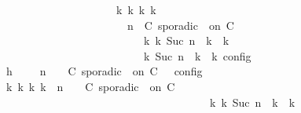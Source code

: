 \begin{isabellebody}
\ \ \ \ \ \ \ \ \ \ \ \ \ \ \ \ \ \ \ \ {\isasymLongrightarrow}\ {\isasymexists}{\isasymGamma}\isactrlsub k\ {\isasymPsi}\isactrlsub k\ {\isasymPhi}\isactrlsub k\ k{\isachardot}\isanewline
\ \ \ \ \ \ \ \ \ \ \ \ \ \ \ \ \ \ \ \ \ \ {\isacharparenleft}{\isacharparenleft}{\isasymGamma}{\isacharcomma}\ n\ {\isasymturnstile}\ {\isacharparenleft}{\isacharparenleft}C\ sporadic\ {\isasymtau}\ on\ C\ {\isacharhash}\ {\isasymPsi}{\isacharparenright}\ {\isasymtriangleright}\ {\isasymPhi}{\isacharparenright}\isanewline
\ \ \ \ \ \ \ \ \ \ \ \ \ \ \ \ \ \ \ \ \ \ \ \ \ \ {\isasymhookrightarrow}\isactrlbsup k\isactrlesup \ {\isacharparenleft}{\isasymGamma}\isactrlsub k{\isacharcomma}\ Suc\ n\ {\isasymturnstile}\ {\isasymPsi}\isactrlsub k\ {\isasymtriangleright}\ {\isasymPhi}\isactrlsub k{\isacharparenright}{\isacharparenright}\isanewline
\ \ \ \ \ \ \ \ \ \ \ \ \ \ \ \ \ \ \ \ \ \ {\isasymand}\ {\isasymrho}\ {\isasymin}\ {\isasymlbrakk}\ {\isasymGamma}\isactrlsub k{\isacharcomma}\ Suc\ n\ {\isasymturnstile}\ {\isasymPsi}\isactrlsub k\ {\isasymtriangleright}\ {\isasymPhi}\isactrlsub k\ {\isasymrbrakk}\isactrlsub c\isactrlsub o\isactrlsub n\isactrlsub f\isactrlsub i\isactrlsub g{\isacartoucheclose}\isanewline
\ \ \ \ \ \ \ \ \isamarkupfalse%
\ {\isacharminus}\isanewline
\ \ \ \ \ \ \ \ \ \ \isamarkupfalse%
\ h{}{\isacharcolon}\ {\isacartoucheopen}{\isasymrho}\ {\isasymin}\ {\isasymlbrakk}\ {\isasymGamma}{\isacharcomma}\ n\ {\isasymturnstile}\ {\isasymPsi}\ {\isasymtriangleright}\ {\isacharparenleft}{\isacharparenleft}C\ sporadic\ {\isasymtau}\ on\ C\ {\isacharhash}\ {\isasymPhi}{\isacharparenright}\ {\isasymrbrakk}\isactrlsub c\isactrlsub o\isactrlsub n\isactrlsub f\isactrlsub i\isactrlsub g{\isacartoucheclose}\isanewline
\ \ \ \ \ \ \ \ \ \ \isamarkupfalse%
\ {\isacartoucheopen}{\isasymexists}{\isasymGamma}\isactrlsub k\ {\isasymPsi}\isactrlsub k\ {\isasymPhi}\isactrlsub k\ k{\isachardot}\ {\isacharparenleft}{\isacharparenleft}{\isasymGamma}{\isacharcomma}\ n\ {\isasymturnstile}\ {\isasymPsi}\ {\isasymtriangleright}\ {\isacharparenleft}{\isacharparenleft}C\ sporadic\ {\isasymtau}\ on\ C\ {\isacharhash}\ {\isasymPhi}{\isacharparenright}{\isacharparenright}\isanewline
\ \ \ \ \ \ \ \ \ \ \ \ \ \ \ \ \ \ \ \ \ \ \ \ \ \ \ \ \ \ \ \ \ \ \ \ \ \ {\isasymhookrightarrow}\isactrlbsup k\isactrlesup \ {\isacharparenleft}{\isasymGamma}\isactrlsub k{\isacharcomma}\ Suc\ n\ {\isasymturnstile}\ {\isasymPsi}\isactrlsub k\ {\isasymtriangleright}\ {\isasymPhi}\isactrlsub k{\isacharparenright}{\isacharparenright}\isanewline

\end{isabellebody}
